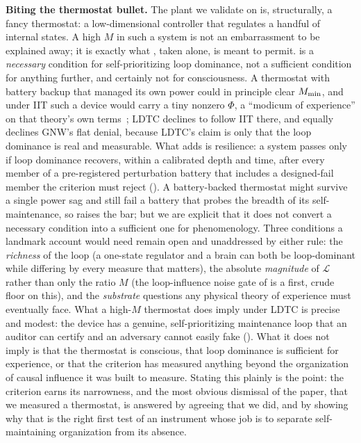 \documentclass[11pt]{article}
\begin{document}
\textbf{Biting the thermostat bullet.} The plant we validate on is, structurally, a fancy thermostat: a low-dimensional controller that regulates a handful of internal states. A high $M$ in such a system is not an embarrassment to be explained away; it is exactly what \NC, taken alone, is meant to permit. \NC is a \emph{necessary} condition for self-prioritizing loop dominance, not a sufficient condition for anything further, and certainly not for consciousness. A thermostat with battery backup that managed its own power could in principle clear $M_{\min}$, and under IIT such a device would carry a tiny nonzero $\Phi$, a ``modicum of experience'' on that theory's own terms~\cite{tononikoch2015here,chalmers1996conscious}; LDTC declines to follow IIT there, and equally declines GNW's flat denial, because LDTC's claim is only that the loop dominance is real and measurable. What \SC adds is resilience: a system passes only if loop dominance recovers, within a calibrated depth and time, after every member of a pre-registered perturbation battery that includes a designed-fail member the criterion must reject (). A battery-backed thermostat might survive a single power sag and still fail a battery that probes the breadth of its self-maintenance, so \SC raises the bar; but we are explicit that it does not convert a necessary condition into a sufficient one for phenomenology. Three conditions a landmark account would need remain open and unaddressed by either rule: the \emph{richness} of the loop (a one-state regulator and a brain can both be loop-dominant while differing by every measure that matters), the absolute \emph{magnitude} of $\mathcal{L}$ rather than only the ratio $M$ (the loop-influence noise gate of  is a first, crude floor on this), and the \emph{substrate} questions any physical theory of experience must eventually face. What a high-$M$ thermostat does imply under LDTC is precise and modest: the device has a genuine, self-prioritizing maintenance loop that an auditor can certify and an adversary cannot easily fake (). What it does not imply is that the thermostat is conscious, that loop dominance is sufficient for experience, or that the criterion has measured anything beyond the organization of causal influence it was built to measure. Stating this plainly is the point: the criterion earns its narrowness, and the most obvious dismissal of the paper, that we measured a thermostat, is answered by agreeing that we did, and by showing why that is the right first test of an instrument whose job is to separate self-maintaining organization from its absence.
\end{document}
